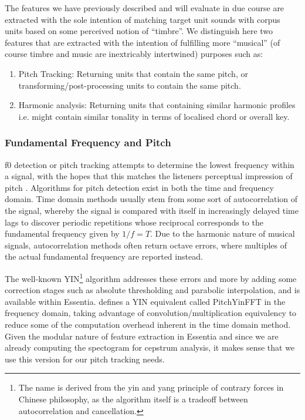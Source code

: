 {{{{The features we have previously described and will evaluate in due course are extracted with the sole intention of matching target unit sounds with corpus units based on some perceived notion of ``timbre''. We distinguish here two features that are extracted with the intention of fulfilling more ``musical'' (of course timbre and music are inextricably intertwined) purposes such as:

\begin{enumerate}
  \item Pitch Tracking: Returning units that contain the same pitch, or transforming/post-processing units to contain the same pitch.
  \item Harmonic analysis: Returning units that containing similar harmonic profiles i.e. might contain similar tonality in terms of localised chord or overall key.
\end{enumerate}


\subsubsection{Fundamental Frequency and Pitch}

\acrfull{f0} detection or pitch tracking attempts to determine the lowest frequency within a signal, with the hopes that this matches the listeners perceptual impression of pitch \citep{Gerhard2003}. Algorithms for pitch detection exist in both the time and frequency domain. Time domain methods usually stem from some sort of autocorrelation of the signal, whereby the signal is compared with itself in increasingly delayed time lags to discover periodic repetitions whose reciprocal corresponds to the fundamental frequency given by $1/f = T$. Due to the harmonic nature of musical signals, autocorrelation methods often return octave errors, where multiples of the actual fundamental frequency are reported instead.

The well-known YIN\footnote{The name is derived from the yin and yang principle of contrary forces in Chinese philosophy, as the algorithm itself is a tradeoff between autocorrelation and cancellation.} algorithm \citep{DeCheveigne2002} addresses these errors and more by adding some correction stages such as absolute thresholding and parabolic interpolation, and is available within Essentia. \cite{Brossier2006} defines a YIN equivalent called PitchYinFFT in the frequency domain, taking advantage of convolution/multiplication equivalency to reduce some of the computation overhead inherent in the time domain method. Given the modular nature of feature extraction in Essentia and since we are already computing the spectogram for cepstrum analysis, it makes sense that we use this version for our pitch tracking needs.

}}}}
